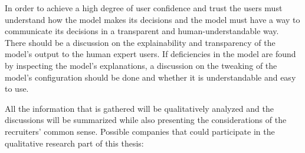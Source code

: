 \documentclass[draft,final]{thesisclass} %
\begin{document}
\begin{enumerate}
\begin{enumerate}
        In order to achieve a high degree of user confidence and trust the users must understand how the model makes its decisions and the model must have a way to communicate its decisions in a transparent and human-understandable way.
        There should be a discussion on the explainability and transparency of the model's output to the human expert users.
        If deficiencies in the model are found by inspecting the model's explanations, a discussion on the tweaking of the model's configuration should be done and whether it is understandable and easy to use.
    \end{enumerate}
\end{enumerate}
All the information that is gathered will be qualitatively analyzed and the discussions will be summarized while also presenting the considerations of the recruiters' common sense.
Possible companies that could participate in the qualitative research part of this thesis:
\end{document}
